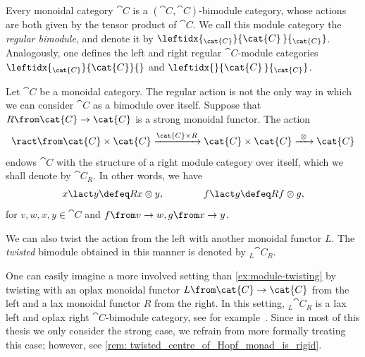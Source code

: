 \begin{example}\label{ex:monoidal-is-bimodule}
  Every monoidal category \(\cat{C}\) is a \((\cat{C},\cat{C})\)\hyp{}bimodule category,
  whose actions are both given by the tensor product of \(\cat{C}\).
  We call this module category the \emph{regular bimodule}, and denote it by \(\leftidx{_{\cat{C}}}{\cat{C}\,}{_{\cat{C}}}\).
  Analogously, one defines the left and right regular \(\cat{C}\)\hyp{}module categories \(\leftidx{_{\cat{C}}}{\cat{C}}{}\)
  and \(\leftidx{}{\cat{C}\,}{_{\cat{C}}}\).
\end{example}

\begin{example}\label{ex:module-twisting}
  Let \(\cat{C}\) be a monoidal category.
  The regular action is not the only way in which we can consider \(\cat{C}\) as a bimodule over itself.
  Suppose that \(R\from \cat{C} \to \cat{C}\) is a strong monoidal functor.
  The action
  \[
    \ract \from \cat{C} \times \cat{C} \xrightarrow{\cat{C} \times R} \cat{C} \times \cat{C} \xrightarrow{\ \otimes\ } \cat{C}
  \]
  endows \(\cat{C}\) with the structure of a right module category over itself,
  which we shall denote by \(\cat{C}_{R}\).
  In other words, we have
  \[
    x \lact y \defeq Rx \otimes y, \qquad\qquad f \lact g \defeq Rf \otimes g,
  \]
  for \(v, w, x, y \in \cat{C}\) and \(f \from v\to w, g \from x \to y\).

  We can also twist the action from the left with another monoidal functor \(L\).
  The \emph{twisted} bimodule obtained in this manner is denoted by \({}_{L\!}{\cat{C}}_{R}\).
\end{example}

\begin{remark}\label{rem: other_variants_of_twisted_centres}
  One can easily imagine a more involved setting than \cref{ex:module-twisting}
  by twisting with an oplax monoidal functor
  \(L \from \cat{C} \to \cat{C}\) from the left
  and a lax monoidal functor \(R\) from the right.
  In this setting, \({}_{L\!}{\cat{C}}_{R}\) is a lax left and oplax right \(\cat{C}\)\hyp{}bimodule category,
  see for example~\cite[Section 2]{Szlachanyi2012:skew-monoidal}.
  Since in most of this thesis we only consider the strong case,
  we refrain from more formally treating this case;
  however, see \cref{rem: twisted_centre_of_Hopf_monad_is_rigid}.
\end{remark}

